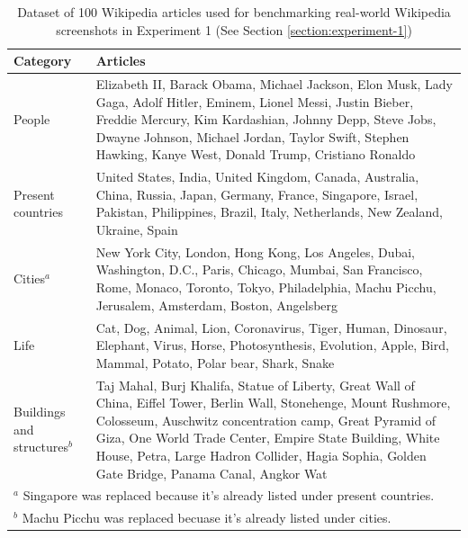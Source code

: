 \documentclass[12pt,oneside]{memoir}
\begin{document}
\begin{table}[ht]
    \centering
    \caption{Dataset of 100 Wikipedia articles used for benchmarking real-world Wikipedia screenshots in Experiment 1 (See Section \ref{section:experiment-1})}
    \label{table:real-world-wikipedia-dataset}
    \begin{tabular}{p{1in}p{4.8in}}
        \toprule
        \textbf{Category} & \textbf{Articles} \\
        \midrule
        People & Elizabeth II, Barack Obama, Michael Jackson, Elon Musk, Lady Gaga, Adolf Hitler, Eminem, Lionel Messi, Justin Bieber, Freddie Mercury, Kim Kardashian, Johnny Depp, Steve Jobs, Dwayne Johnson, Michael Jordan, Taylor Swift, Stephen Hawking, Kanye West, Donald Trump, Cristiano Ronaldo\\
        \midrule
        Present countries & United States, India, United Kingdom, Canada, Australia, China, Russia, Japan, Germany, France, Singapore, Israel, Pakistan, Philippines, Brazil, Italy, Netherlands, New Zealand, Ukraine, Spain\\
        \midrule
        Cities$^a$ & New York City, London, Hong Kong, Los Angeles, Dubai, Washington, D.C., Paris, Chicago, Mumbai, San Francisco, Rome, Monaco, Toronto, Tokyo, Philadelphia, Machu Picchu, Jerusalem, Amsterdam, Boston, Angelsberg\\
        \midrule
        Life & Cat, Dog, Animal, Lion, Coronavirus, Tiger, Human, Dinosaur, Elephant, Virus, Horse, Photosynthesis, Evolution, Apple, Bird, Mammal, Potato, Polar bear, Shark, Snake\\
        \midrule
        Buildings and structures$^b$ & Taj Mahal, Burj Khalifa, Statue of Liberty, Great Wall of China, Eiffel Tower, Berlin Wall, Stonehenge, Mount Rushmore, Colosseum, Auschwitz concentration camp, Great Pyramid of Giza, One World Trade Center, Empire State Building, White House, Petra, Large Hadron Collider, Hagia Sophia, Golden Gate Bridge, Panama Canal, Angkor Wat\\
        \bottomrule
        \multicolumn{2}{l}{\footnotesize $^a$ Singapore was replaced because it's already listed under present countries.}\\
        \multicolumn{2}{l}{\footnotesize $^b$ Machu Picchu was replaced becuase it's already listed under cities.}
    \end{tabular}
\end{table}
\end{document}
